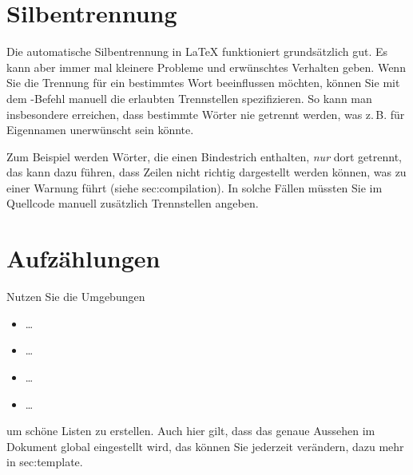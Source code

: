 \section{Silbentrennung}
\label{sec:hyphenation}
Die automatische Silbentrennung in \LaTeX{} funktioniert grundsätzlich gut. Es kann aber immer mal kleinere Probleme und erwünschtes Verhalten geben. Wenn Sie die Trennung für ein bestimmtes Wort beeinflussen möchten, können Sie mit dem -Befehl manuell die erlaubten Trennstellen spezifizieren. So kann man insbesondere erreichen, dass bestimmte Wörter nie getrennt werden, was z.\,B. für Eigennamen unerwünscht sein könnte.
\par
Zum Beispiel werden Wörter, die einen Bindestrich enthalten, \emph{nur} dort getrennt, das kann dazu führen, dass Zeilen nicht richtig dargestellt werden können, was zu einer Warnung führt (siehe sec:compilation). In solche Fällen müssten Sie im Quellcode manuell zusätzlich Trennstellen angeben.
%
%
\section{Aufzählungen}
Nutzen Sie die Umgebungen
%
\begin{itemize}
 \item {} \ldots {}
 \item {} \ldots {}
 \item {} \ldots {}
 \item {} \ldots {}
\end{itemize}
%
um schöne Listen zu erstellen. Auch hier gilt, dass das genaue Aussehen im Dokument global eingestellt wird, das können Sie jederzeit verändern, dazu mehr in sec:template.
%
%
